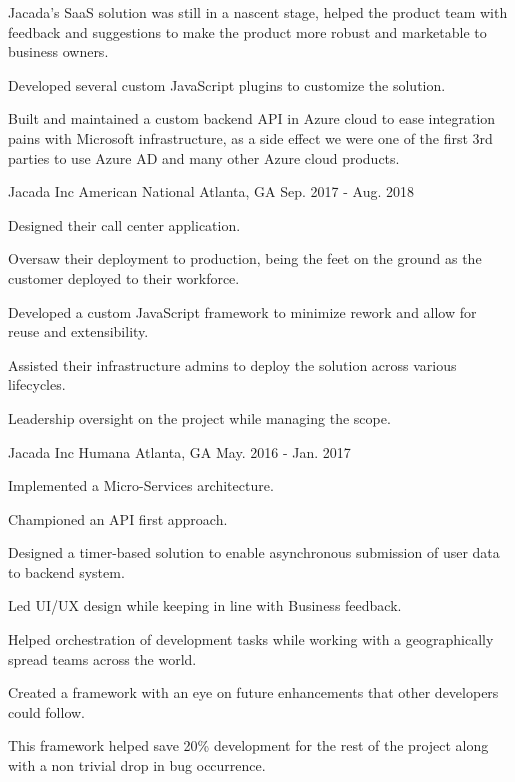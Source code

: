 \begin{cventries}
{\begin{cvitems}
    \item {Jacada’s SaaS solution was still in a nascent stage, helped the product team with feedback and suggestions to make the product more robust and marketable to business owners.}
    \item {Developed several custom JavaScript plugins to customize the solution.}
    \item {Built and maintained a custom backend API in Azure cloud to ease integration pains with Microsoft infrastructure, as a side effect we were one of the first 3rd parties to use Azure AD and many other Azure cloud products.}
  \end{cvitems}
}
\cventry
{Jacada Inc} %
{American National} %
{Atlanta, GA} %
{Sep. 2017 - Aug. 2018} %
{
  \begin{cvitems} %
    \item {Designed their call center application.}
    \item {Oversaw their deployment to production, being the feet on the ground as the customer deployed to their workforce.}
    \item {Developed a custom JavaScript framework to minimize rework and allow for reuse and extensibility.}
    \item {Assisted their infrastructure admins to deploy the solution across various lifecycles.}
    \item {Leadership oversight on the project while managing the scope.}
  \end{cvitems}
}
\cventry
{Jacada Inc} %
{Humana} %
{Atlanta, GA} %
{May. 2016 - Jan. 2017} %
{
  \begin{cvitems} %
    \item {Implemented a Micro-Services architecture.}
    \item {Championed an API first approach.}
    \item {Designed a timer-based solution to enable asynchronous submission of user data to backend system.}
    \item {Led UI/UX design while keeping in line with Business feedback.}
    \item {Helped orchestration of development tasks while working with a geographically spread teams across the world.}
    \item {Created a framework with an eye on future enhancements that other developers could follow.}
    \item {This framework helped save 20\% development for the rest of the project along with a non trivial drop in bug occurrence.}
  \end{cvitems}
}

\end{cventries}
